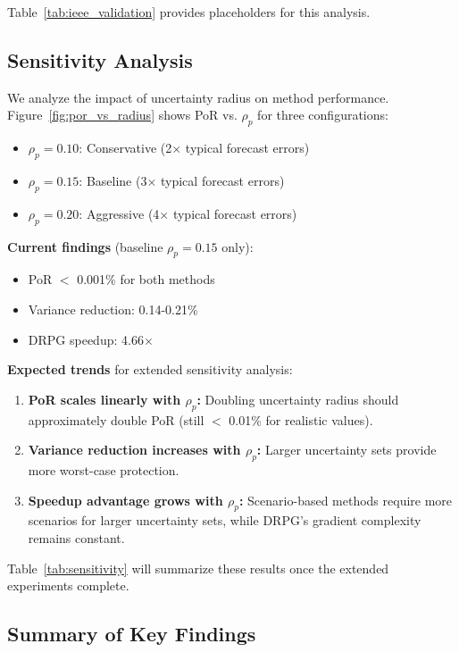 Table~\ref{tab:ieee_validation} provides placeholders for this analysis.

\subsection{Sensitivity Analysis}
\label{sec:sensitivity_analysis}

We analyze the impact of uncertainty radius on method performance. Figure~\ref{fig:por_vs_radius} shows PoR vs. $\rho_p$ for three configurations:

\begin{itemize}
    \item $\rho_p = 0.10$: Conservative (2$\times$ typical forecast errors)
    \item $\rho_p = 0.15$: Baseline (3$\times$ typical forecast errors)
    \item $\rho_p = 0.20$: Aggressive (4$\times$ typical forecast errors)
\end{itemize}

\textbf{Current findings} (baseline $\rho_p = 0.15$ only):
\begin{itemize}
    \item PoR $<$ 0.001\% for both methods
    \item Variance reduction: 0.14-0.21\%
    \item DRPG speedup: 4.66$\times$
\end{itemize}

\textbf{Expected trends} for extended sensitivity analysis:
\begin{enumerate}
    \item \textbf{PoR scales linearly with $\rho_p$:} Doubling uncertainty radius should approximately double PoR (still $<$ 0.01\% for realistic values).

    \item \textbf{Variance reduction increases with $\rho_p$:} Larger uncertainty sets provide more worst-case protection.

    \item \textbf{Speedup advantage grows with $\rho_p$:} Scenario-based methods require more scenarios for larger uncertainty sets, while DRPG's gradient complexity remains constant.
\end{enumerate}

Table~\ref{tab:sensitivity} will summarize these results once the extended experiments complete.

\subsection{Summary of Key Findings}

